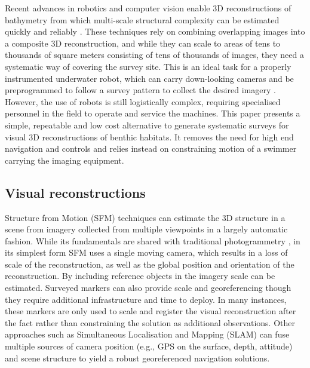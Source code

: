 \newline

Recent advances in robotics and computer vision enable 3D reconstructions of bathymetry from which multi-scale structural complexity can be estimated quickly and reliably \cite{Friedman_2012}. These techniques rely on combining overlapping images into a composite 3D reconstruction, and while they can scale to areas of tens to thousands of square meters consisting of tens of thousands of images, they need a systematic way of covering the survey site. This is an ideal task for a properly instrumented underwater robot, which can carry down-looking cameras and be preprogrammed to follow a survey pattern to collect the desired imagery \cite{Williams_2012}. However, the use of robots is still logistically complex, requiring specialised personnel in the field to operate and service the machines. 
This paper presents a simple, repeatable and low cost alternative to generate systematic surveys for visual 3D reconstructions of benthic habitats. It removes the need for high end navigation and controls and relies instead on constraining motion of a swimmer carrying the imaging equipment. 

\subsection{Visual reconstructions} \label{sec:VisRec}
Structure from Motion (SFM) techniques \cite{Hartley_2004} can estimate the 3D structure in a scene from imagery collected from multiple viewpoints in a largely automatic fashion. While its fundamentals are shared with traditional photogrammetry \cite{Jones_1982}, in its simplest form SFM uses a single moving camera, which results in a loss of scale of the reconstruction, as well as the global position and orientation of the reconstruction. By including reference objects in the imagery scale can be estimated. Surveyed markers can also provide scale and georeferencing though they require additional infrastructure and time to deploy. In many instances, these markers are only used to scale and register the visual reconstruction after the fact rather than constraining the solution as additional observations.
Other approaches such as Simultaneous Localisation and Mapping (SLAM) \cite{Thrun_2008} can fuse multiple sources of camera position (e.g., GPS on the surface, depth, attitude) and scene structure to yield a robust georeferenced navigation solutions.

